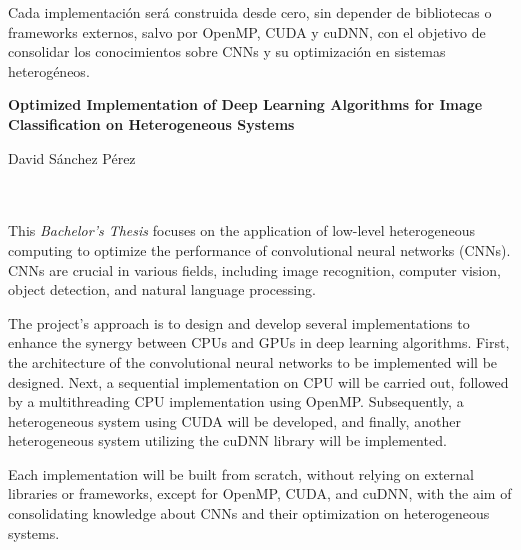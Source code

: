 Cada implementación será construida desde cero, sin depender de bibliotecas o frameworks externos, salvo por OpenMP, CUDA y cuDNN, con el objetivo de consolidar los conocimientos sobre CNNs y su optimización en sistemas heterogéneos.
\cleardoublepage


\thispagestyle{empty}


\begin{center}
{\large\bfseries Optimized Implementation of Deep Learning Algorithms for Image Classification on Heterogeneous Systems}\\
\end{center}
\begin{center}
David Sánchez Pérez\\
\end{center}

\\

\vspace{0.7cm}
\\

This \textit{Bachelor's Thesis} focuses on the application of low-level heterogeneous computing to optimize the performance of convolutional neural networks (CNNs). CNNs are crucial in various fields, including image recognition, computer vision, object detection, and natural language processing.

The project's approach is to design and develop several implementations to enhance the synergy between CPUs and GPUs in deep learning algorithms. First, the architecture of the convolutional neural networks to be implemented will be designed. Next, a sequential implementation on CPU will be carried out, followed by a multithreading CPU implementation using OpenMP. Subsequently, a heterogeneous system using CUDA will be developed, and finally, another heterogeneous system utilizing the cuDNN library will be implemented.

Each implementation will be built from scratch, without relying on external libraries or frameworks, except for OpenMP, CUDA, and cuDNN, with the aim of consolidating knowledge about CNNs and their optimization on heterogeneous systems.


